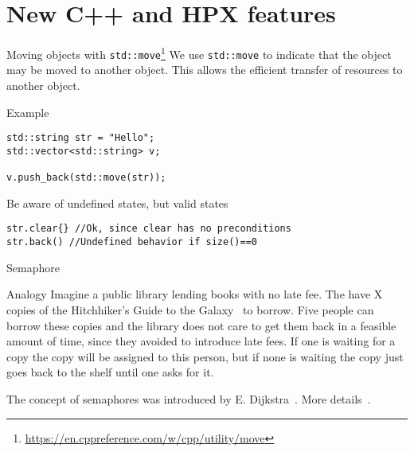 \documentclass[12pt,t]{beamer}
\begin{document}
\section{New C++ and HPX features }

\begin{frame}[fragile]{Moving objects with \lstinline|std::move|\footnote{\tiny\url{https://en.cppreference.com/w/cpp/utility/move}}} 
We use \lstinline|std::move| to indicate that the object may be moved to another object. This allows the efficient transfer of resources to another object.

\begin{block}{Example}
\begin{lstlisting}
std::string str = "Hello";
std::vector<std::string> v;

v.push_back(std::move(str));
\end{lstlisting}
\end{block}

\begin{block}{Be aware of undefined states, but valid states}
\begin{lstlisting}
str.clear{} //Ok, since clear has no preconditions
str.back() //Undefined behavior if size()==0
\end{lstlisting}
\end{block}


\end{frame}

\begin{frame}{Semaphore}

\begin{block}{Analogy}
Imagine a public library lending books with no late fee. The have X copies of the Hitchhiker's Guide to the Galaxy~\cite{adams2017hitchhiker} to borrow. Five people can borrow these copies and the library does not care to get them back in a feasible amount of time, since they avoided to introduce late fees. If one is waiting for a copy the copy will be assigned to this person, but if none is waiting the copy just goes back to the shelf until one asks for it. 
\end{block}
\vspace{0.5cm}
The concept of semaphores was introduced by E. Dijkstra~\cite{dijkstra1962over}. More details~\cite{downey2008little}.
\end{frame}
\end{document}
